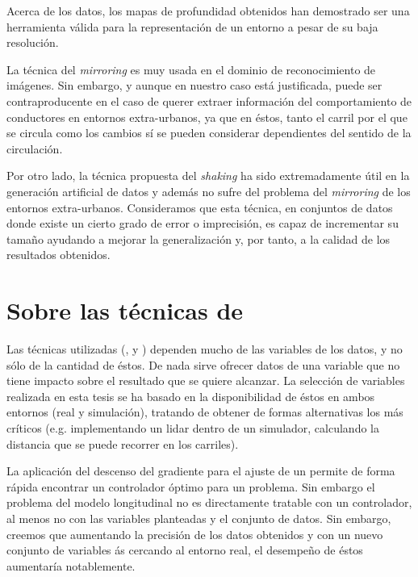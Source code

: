 Acerca de los datos, los mapas de profundidad obtenidos han demostrado ser una herramienta válida para la representación de un entorno a pesar de su baja resolución.

La técnica del \textit{mirroring} es muy usada en el dominio de reconocimiento de imágenes. Sin embargo, y aunque en nuestro caso está justificada, puede ser contraproducente en el caso de querer extraer información del comportamiento de conductores en entornos extra-urbanos, ya que en éstos, tanto el carril por el que se circula como los cambios sí se pueden considerar dependientes del sentido de la circulación.

Por otro lado, la técnica propuesta del \textit{shaking} ha sido extremadamente útil en la generación artificial de datos y además no sufre del problema del \textit{mirroring} de los entornos extra-urbanos. Consideramos que esta técnica, en conjuntos de datos donde existe un cierto grado de error o imprecisión, es capaz de incrementar su tamaño ayudando a mejorar la generalización y, por tanto, a la calidad de los resultados obtenidos.

\section{Sobre las técnicas de }

Las técnicas utilizadas (,  y ) dependen mucho de las variables de los datos, y no sólo de la cantidad de éstos. De nada sirve ofrecer datos de una variable que no tiene impacto sobre el resultado que se quiere alcanzar. La selección de variables realizada en esta tesis se ha basado en la disponibilidad de éstos en ambos entornos (real y simulación), tratando de obtener de formas alternativas los más críticos (e.g. implementando un \acrshort{lidar} dentro de un simulador, calculando la distancia que se puede recorrer en los carriles).

La aplicación del descenso del gradiente para el ajuste de un  permite de forma rápida encontrar un controlador óptimo para un problema. Sin embargo el problema del modelo longitudinal no es directamente tratable con un controlador, al menos no con las variables planteadas y el conjunto de datos. Sin embargo, creemos que aumentando la precisión de los datos obtenidos y con un nuevo conjunto de variables ás cercando al entorno real, el desempeño de éstos aumentaría notablemente.

